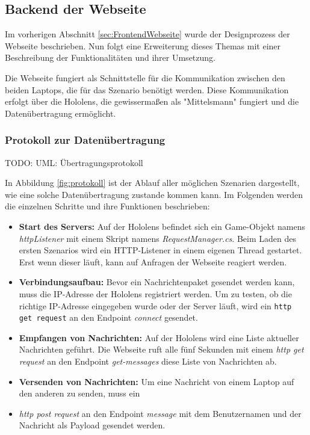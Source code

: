 \subsection{Backend der Webseite} 

Im vorherigen Abschnitt \ref{sec:FrontendWebseite} wurde der Designprozess der Webseite beschrieben. Nun folgt eine
Erweiterung dieses Themas mit einer Beschreibung der Funktionalitäten und ihrer Umsetzung.

Die Webseite fungiert als Schnittstelle für die Kommunikation zwischen den beiden Laptops, die für das Szenario benötigt
werden. Diese Kommunikation erfolgt über die Hololens, die gewissermaßen als "Mittelsmann" fungiert und die Datenübertragung ermöglicht.
\subsubsection{Protokoll zur Datenübertragung}

TODO: UML: Übertragungsprotokoll

In Abbildung \ref{fig:protokoll} ist der Ablauf aller möglichen Szenarien dargestellt, wie eine solche Datenübertragung
zustande kommen kann. Im Folgenden werden die einzelnen Schritte und ihre Funktionen beschrieben:

\begin{itemize}
    \item \textbf{Start des Servers:} Auf der Hololens befindet sich ein Game-Objekt namens \textit{httpListener} mit einem
    Skript namens \textit{RequestManager.cs}. Beim Laden des ersten Szenarios wird ein HTTP-Listener in einem eigenen Thread
    gestartet. Erst wenn dieser läuft, kann auf Anfragen der Webseite reagiert werden.
    \item \textbf{Verbindungsaufbau:} Bevor ein Nachrichtenpaket gesendet werden kann, muss die IP-Adresse der Hololens
    registriert werden. Um zu testen, ob die richtige IP-Adresse eingegeben wurde oder der Server läuft, wird ein
    \texttt{http get request} an den Endpoint \textit{connect} gesendet.
    \item \textbf{Empfangen von Nachrichten:} Auf der Hololens wird eine Liste aktueller Nachrichten geführt. Die Webseite
    ruft alle fünf Sekunden mit einem \textit{http get request} an den Endpoint \textit{get-messages} diese Liste von Nachrichten ab.
    \item \textbf{Versenden von Nachrichten:} Um eine Nachricht von einem Laptop auf den anderen zu senden, muss ein
    \item \textit{http post request} an den Endpoint \textit{message} mit dem Benutzernamen und der Nachricht als Payload gesendet werden.
\end{itemize}

